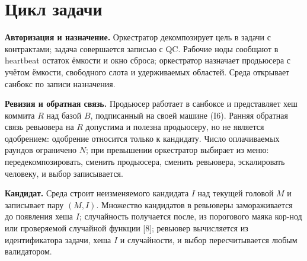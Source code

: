 \documentclass[11pt,a4paper]{article}
\begin{document}
\section{Цикл задачи}

\begin{center}
\end{center}

\textbf{Авторизация и назначение.} Оркестратор декомпозирует цель в задачи с контрактами; задача совершается записью с QC. Рабочие ноды сообщают в heartbeat остаток ёмкости и окно сброса; оркестратор назначает продьюсера с учётом ёмкости, свободного слота и удерживаемых областей. Среда открывает санбокс по записи назначения.

\textbf{Ревизия и обратная связь.} Продьюсер работает в санбоксе и представляет хеш коммита $R$ над базой $B$, подписанный на своей машине (I6). Ранняя обратная связь ревьювера на $R$ допустима и полезна продьюсеру, но не является одобрением: одобрение относится только к кандидату. Число оплачиваемых раундов ограничено $N$; при превышении оркестратор выбирает из меню: передекомпозировать, сменить продьюсера, сменить ревьювера, эскалировать человеку, и выбор записывается.

\textbf{Кандидат.} Среда строит неизменяемого кандидата $I$ над текущей головой $M$ и записывает пару $(M, I)$. Множество кандидатов в ревьюверы замораживается до появления хеша $I$; случайность получается после, из порогового маяка кор-нод или проверяемой случайной функции [8]; ревьювер вычисляется из идентификатора задачи, хеша $I$ и случайности, и выбор пересчитывается любым валидатором.
\end{document}
